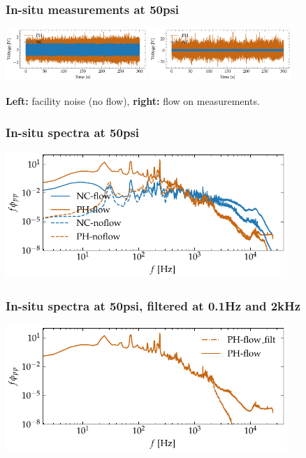 \documentclass[aspectratio=169,9pt]{beamer}
\begin{document}
\begin{frame}
    \frametitle{In-situ measurements at 50psi}
        \centering
        \includegraphics[width=0.4\textwidth]{sanity/50psi/PH-NKD/calib_ts_signals_50psi_nf.pdf}
        \includegraphics[width=0.4\textwidth]{sanity/50psi/PH-NKD/calib_ts_signals_50psi_f.pdf}

        \centering
        \textbf{Left:} facility noise (no flow), \textbf{right:} flow on measurements.
\end{frame}

\begin{frame}
    \frametitle{In-situ spectra at 50psi}
        \centering
        \includegraphics[width=0.8\textwidth]{sanity/50psi/PH-NKD/calib_spectra_50psi_f.pdf}
\end{frame}

\begin{frame}
    \frametitle{In-situ spectra at 50psi, filtered at 0.1Hz and 2kHz}
        \centering
        \includegraphics[width=0.8\textwidth]{sanity/50psi/PH-NKD/calib_spectra_50psi_f_filt.pdf}
\end{frame}
\end{document}
